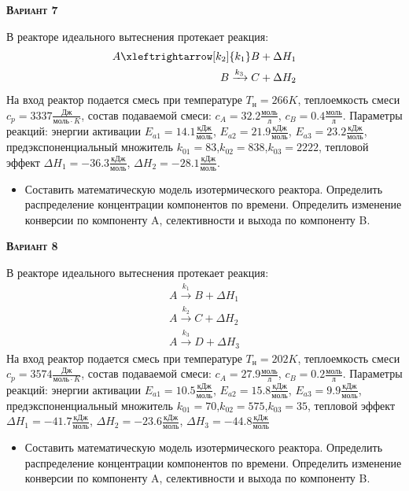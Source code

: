 \textsc{\textbf{Вариант 7}}

 В реакторе идеального вытеснения протекает реакция: \begin{equation*} \begin{aligned} A \xleftrightarrow[k_2]{k_1} B + \Delta H_1 \\ B \xrightarrow{k_3} C + \Delta H_2 \end{aligned} \end{equation*}                              На вход  реактор подается смесь при температуре $ T_{н} =  266 K$, теплоемкость смеси $c_p= 3337 \frac{Дж}{моль \cdot K}$, состав подаваемой смеси: $c_A=32.2 \frac{моль}{л}$, $c_B=0.4 \frac{моль}{л}$. Параметры реакций: энергии активации $E_{a1}=14.1 \frac{кДж}{моль}$, $E_{a2}=21.9  \frac{кДж}{моль}$, $E_{a3}=23.2  \frac{кДж}{моль}$, предэкспоненциальный множитель $k_{01}=        83$,$k_{02}=       838$,$k_{03}=      2222$, тепловой эффект $\Delta H_1= -36.3  \frac{кДж}{моль}$, $\Delta H_2=-28.1 \frac{кДж}{моль}$.\begin{itemize} \item Составить математическую модель изотермического реактора. Определить распределение концентрации компонентов по времени. Определить изменение конверсии по компоненту A, селективности и выхода по компоненту B. \end{itemize}

\textsc{\textbf{Вариант 8}}

 В реакторе идеального вытеснения протекает реакция: \begin{equation*} \begin{aligned} A \xrightarrow{k_1} B + \Delta H_1 \\ A \xrightarrow{k_2} C + \Delta H_2 \\ A \xrightarrow{k_3} D + \Delta H_3 \end{aligned} \end{equation*} На вход  реактор подается смесь при температуре $ T_{н} =  202 K$, теплоемкость смеси $c_p= 3574 \frac{Дж}{моль \cdot K}$, состав подаваемой смеси: $c_A=27.9 \frac{моль}{л}$, $c_B=0.2 \frac{моль}{л}$. Параметры реакций: энергии активации $E_{a1}=10.5 \frac{кДж}{моль}$, $E_{a2}=15.8  \frac{кДж}{моль}$, $E_{a3}= 9.9  \frac{кДж}{моль}$, предэкспоненциальный множитель $k_{01}=        70$,$k_{02}=       575$,$k_{03}=        35$, тепловой эффект $\Delta H_1= -41.7 \frac{кДж}{моль}$, $\Delta H_2=-23.6 \frac{кДж}{моль}$, $\Delta H_3 = -44.8 \frac{кДж}{моль}$\begin{itemize} \item Составить математическую модель изотермического реактора. Определить распределение концентрации компонентов по времени. Определить изменение конверсии по компоненту A, селективности и выхода по компоненту B. \end{itemize}


